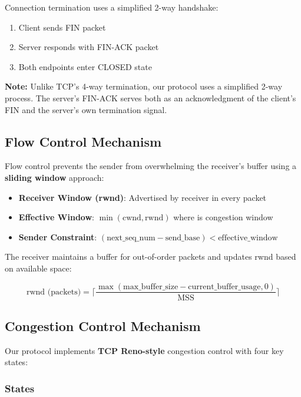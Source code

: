 \documentclass[11pt,a4paper]{article}
\begin{document}
Connection termination uses a simplified 2-way handshake:

\begin{enumerate}
    \item Client sends FIN packet
    \item Server responds with FIN-ACK packet
    \item Both endpoints enter CLOSED state
\end{enumerate}

\textbf{Note:} Unlike TCP's 4-way termination, our protocol uses a simplified 2-way process. The server's FIN-ACK serves both as an acknowledgment of the client's FIN and the server's own termination signal.

\subsection{Flow Control Mechanism}

Flow control prevents the sender from overwhelming the receiver's buffer using a \textbf{sliding window} approach:

\begin{itemize}
    \item \textbf{Receiver Window (rwnd)}: Advertised by receiver in every packet
    \item \textbf{Effective Window}: $\min(\text{cwnd}, \text{rwnd})$ where is congestion window
    \item \textbf{Sender Constraint}: $(\text{next\_seq\_num} - \text{send\_base}) < \text{effective\_window}$
\end{itemize}

The receiver maintains a buffer for out-of-order packets and updates rwnd based on available space:

\begin{equation}
\text{rwnd (packets)} = \lceil\frac{\max(\text{max\_buffer\_size} - \text{current\_buffer\_usage}, 0)}{\text{MSS}}\rceil
\end{equation}

\subsection{Congestion Control Mechanism}

Our protocol implements \textbf{TCP Reno-style} congestion control with four key states:

\subsubsection{States}
\end{document}
